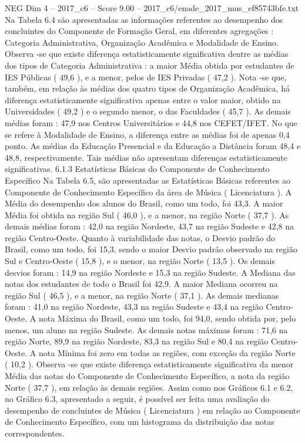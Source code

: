 \begin{textsample}{NEG Dim 4 – 2017\_c6 – Score 9.00 – 2017\_c6/enade\_2017\_mus\_ef85743bfe.txt}
Na Tabela 6.4 são apresentadas as informações referentes ao desempenho dos concluintes do Componente de Formação Geral, em diferentes agregações : Categoria Administrativa, Organização Acadêmica e Modalidade de Ensino.
Observa -se que existe diferença estatisticamente significativa dentre as médias dos tipos de Categoria Administrativa : a maior Média obtida por estudantes de IES Públicas ( 49,6 ), e a menor, pelos de IES Privadas ( 47,2 ).
Nota -se que, também, em relação às médias dos quatro tipos de Organização Acadêmica, há diferença estatisticamente significativa apenas entre o valor maior, obtido na Universidades ( 49,2 ) e o segundo menor, o das Faculdades ( 45,7 ).
As demais médias foram : 47,9 nos Centros Universitários e 44,8 nos CEFET/IFET.
No que se refere à Modalidade de Ensino, a diferença entre as médias foi de apenas 0,4 ponto.
As médias da Educação Presencial e da Educação a Distância foram 48,4 e 48,8, respectivamente.
Tais médias não apresentam diferenças estatisticamente significativas. 6.1.3 Estatísticas Básicas do Componente de Conhecimento Específico Na Tabela 6.5, são apresentadas as Estatísticas Básicas referentes ao Componente de Conhecimento Específico da área de Música ( Licenciatura ).
A Média do desempenho dos alunos do Brasil, como um todo, foi 43,3.
A maior Média foi obtida na região Sul ( 46,0 ), e a menor, na região Norte ( 37,7 ).
As demais médias foram : 42,0 na região Nordeste, 43,7 na região Sudeste e 42,8 na região Centro-Oeste.
Quanto à variabilidade das notas, o Desvio padrão do Brasil, como um todo, foi 15,3, sendo o maior Desvio padrão observado na região Sul e Centro-Oeste ( 15,8 ), e o menor, na região Norte ( 13,5 ).
Os demais desvios foram : 14,9 na região Nordeste e 15,3 na região Sudeste.
A Mediana das notas dos estudantes de todo o Brasil foi 42,9.
A maior Mediana ocorreu na região Sul ( 46,5 ), e a menor, na região Norte ( 37,1 ).
As demais medianas foram : 41,0 na região Nordeste, 43,3 na região Sudeste e 43,4 na região Centro-Oeste.
A nota Máxima do Brasil, como um todo, foi 94,0, sendo obtida por, pelo menos, um aluno na região Sudeste.
As demais notas máximas foram : 71,6 na região Norte, 89,9 na região Nordeste, 83,3 na região Sul e 80,4 na região Centro-Oeste.
A nota Mínima foi zero em todas as regiões, com exceção da região Norte ( 10,2 ).
Observa -se que existe diferença estatisticamente significativa da menor Média das notas do Componente de Conhecimento Específico, a nota da região Norte ( 37,7 ), em relação às demais regiões.
Assim como nos Gráficos 6.1 e 6.2, no Gráfico 6.3, apresentado a seguir, é possível ser feita uma avaliação do desempenho de concluintes de Música ( Licenciatura ) em relação ao Componente de Conhecimento Específico, com um histograma da distribuição das notas correspondentes.

\end{textsample}
